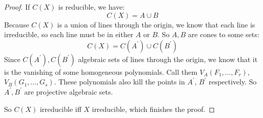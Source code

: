 \documentclass{article}
\begin{document}
\begin{itemize}
\begin{proof}
                If $C(X)$ is reducible, we have:
                    \begin{equation*}
                        C(X) = A \cup B
                    \end{equation*}
                Because $C(X)$ is a union of lines through the origin, we know that each line is irreducible, so each line must be in either $A$ or $B$. So $A, B$ are cones to some sets:
                    \begin{equation*}
                        C(X) = C(A^{\prime}) \cup C(B^{\prime})
                    \end{equation*}
                Since $C(A^{\prime}), C(B^{\prime})$ algebraic sets of lines through the origin, we know that it is the vanishing of some homogeneous polynomials. Call them $V_{A}(F_{1}, \ldots, F_{r})$, $V_{B}(G_{1}, \ldots, G_{s})$. These polynomials also kill the points in $A^{\prime}$, $B^{\prime}$ respectively. So $A^{\prime}, B^{\prime}$ are projective algebraic sets.

                So $C(X)$ irreducible iff $X$ irreducible, which finishes the proof.
            \end{proof}
    \end{itemize}
\end{document}
